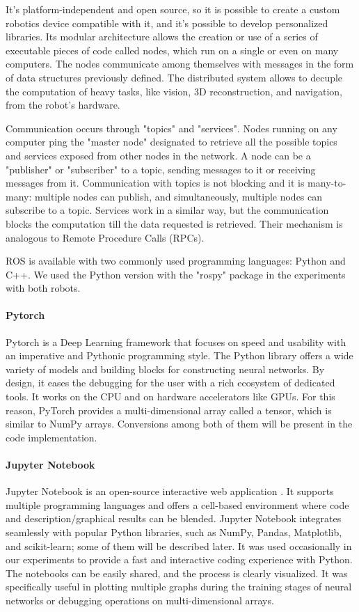 It's platform-independent and open source, so it is possible to create a custom robotics device compatible with it, and it's possible to develop personalized libraries. Its modular architecture allows the creation or use of a series of executable pieces of code called nodes, which run on a single or even on many computers. The nodes communicate among themselves with messages in the form of data structures previously defined. The distributed system allows to decuple the computation of heavy tasks, like vision, 3D reconstruction, and navigation, from the robot's hardware. 

Communication occurs through "topics" and "services". Nodes running on any computer ping the "master node" designated to retrieve all the possible topics and services exposed from other nodes in the network. A node can be a "publisher" or "subscriber" to a topic, sending messages to it or receiving messages from it. Communication with topics is not blocking and it is many-to-many: multiple nodes can publish, and simultaneously, multiple nodes can subscribe to a topic. Services work in a similar way, but the communication blocks the computation till the data requested is retrieved. Their mechanism is analogous to Remote Procedure Calls (RPCs). 

ROS is available with two commonly used programming languages: Python and C++. We used the Python version with the "rospy" package in the experiments with both robots.

\paragraph{Pytorch}
Pytorch is a Deep Learning framework \cite{paszke2019pytorch} that focuses on speed and usability with an imperative and Pythonic programming style.  The Python library \cite{url:pytorch} offers a wide variety of models and building blocks for constructing neural networks. By design, it eases the debugging for the user with a rich ecosystem of dedicated tools. It works on the CPU and on hardware accelerators like GPUs. For this reason, PyTorch provides a multi-dimensional array called a tensor, which is similar to NumPy arrays. Conversions among both of them will be present in the code implementation. 

\paragraph{Jupyter Notebook}
Jupyter Notebook is an open-source interactive web application \cite{url:jupyter}. It supports multiple programming languages and offers a cell-based environment where code and description/graphical results can be blended. Jupyter Notebook integrates seamlessly with popular Python libraries, such as NumPy, Pandas, Matplotlib, and scikit-learn; some of them will be described later. It was used occasionally in our experiments to provide a fast and interactive coding experience with Python. The notebooks can be easily shared, and the process is clearly visualized. It was specifically useful in plotting multiple graphs during the training stages of neural networks or debugging operations on multi-dimensional arrays. 

